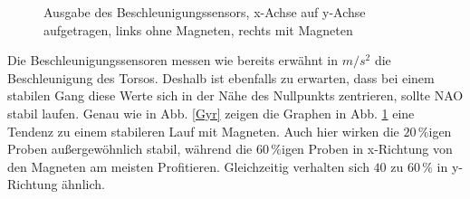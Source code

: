 \begin{figure}[htb]
\begin{adjustwidth}{-0.2\linewidth}{-0.2\linewidth}
\begin{subfigure}[c]{.45\linewidth}
			\vspace{5pt}
		\end{subfigure}
	\end{adjustwidth}
	\caption{Ausgabe des Beschleunigungssensors, x-Achse auf y-Achse aufgetragen, links ohne Magneten, rechts mit Magneten} \label{Acc}
\end{figure}
Die Beschleunigungssensoren messen wie bereits erwähnt in $\unit{m/s^2}$ die Beschleunigung des Torsos. Deshalb ist ebenfalls zu erwarten, dass bei einem stabilen Gang diese Werte sich in der Nähe des Nullpunkts zentrieren, sollte NAO stabil laufen. Genau wie in Abb. \ref{Gyr} zeigen die Graphen in Abb. \ref{Acc} eine Tendenz zu einem stabileren Lauf mit Magneten. Auch hier wirken die $20\,\%$igen Proben außergewöhnlich stabil, während die $60\,\%$igen Proben in x-Richtung von den Magneten am meisten Profitieren. Gleichzeitig verhalten sich $40$ zu $60\,\%$ in y-Richtung ähnlich. 

